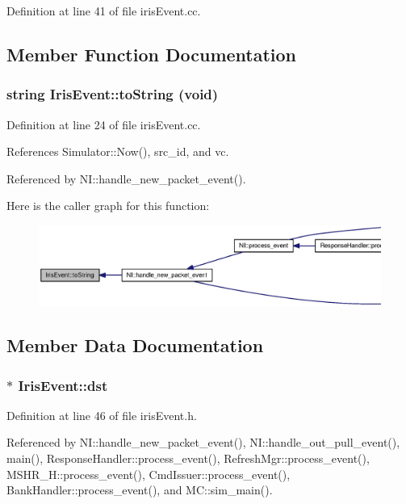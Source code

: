 Definition at line 41 of file irisEvent.cc.

\subsection{Member Function Documentation}
\subsubsection[{toString}]{\setlength{\rightskip}{0pt plus 5cm}string IrisEvent::toString (void)}\label{classIrisEvent_0af2990076aab1512a61908435010824}




Definition at line 24 of file irisEvent.cc.

References Simulator::Now(), src\_\-id, and vc.

Referenced by NI::handle\_\-new\_\-packet\_\-event().

Here is the caller graph for this function:\nopagebreak
\begin{figure}[H]
\begin{center}
\leavevmode
\includegraphics[width=420pt]{classIrisEvent_0af2990076aab1512a61908435010824_icgraph}
\end{center}
\end{figure}


\subsection{Member Data Documentation}
\subsubsection[{dst}]{$\ast$ {\bf IrisEvent::dst}}\label{classIrisEvent_dbc9bf0bf1b6c36e3513cc4acde2e8dc}




Definition at line 46 of file irisEvent.h.

Referenced by NI::handle\_\-new\_\-packet\_\-event(), NI::handle\_\-out\_\-pull\_\-event(), main(), ResponseHandler::process\_\-event(), RefreshMgr::process\_\-event(), MSHR\_\-H::process\_\-event(), CmdIssuer::process\_\-event(), BankHandler::process\_\-event(), and MC::sim\_\-main().
